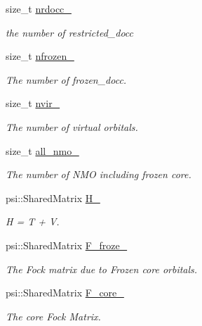 \begin{DoxyCompactItemize}
size\+\_\+t \mbox{\hyperlink{classforte_1_1_orbital_optimizer_a086d17877eb4c87547c6caaf7660ec27}{nrdocc\+\_\+}}
\begin{DoxyCompactList}\small\item\em the number of restricted\+\_\+docc \end{DoxyCompactList}\item 
size\+\_\+t \mbox{\hyperlink{classforte_1_1_orbital_optimizer_a8d53170a8913f34344f9068d65a948f9}{nfrozen\+\_\+}}
\begin{DoxyCompactList}\small\item\em The number of frozen\+\_\+docc. \end{DoxyCompactList}\item 
size\+\_\+t \mbox{\hyperlink{classforte_1_1_orbital_optimizer_a18aeed651c18e3774ceded5f83b424ec}{nvir\+\_\+}}
\begin{DoxyCompactList}\small\item\em The number of virtual orbitals. \end{DoxyCompactList}\item 
size\+\_\+t \mbox{\hyperlink{classforte_1_1_orbital_optimizer_a3049d4ffa9016122c75062f30273585d}{all\+\_\+nmo\+\_\+}}
\begin{DoxyCompactList}\small\item\em The number of N\+MO including frozen core. \end{DoxyCompactList}\item 
psi\+::\+Shared\+Matrix \mbox{\hyperlink{classforte_1_1_orbital_optimizer_ad82c00e627723c1fe086d03783e8cd28}{H\+\_\+}}
\begin{DoxyCompactList}\small\item\em H = T + V. \end{DoxyCompactList}\item 
psi\+::\+Shared\+Matrix \mbox{\hyperlink{classforte_1_1_orbital_optimizer_a82e9925ea8bd99323035022a23e2268d}{F\+\_\+froze\+\_\+}}
\begin{DoxyCompactList}\small\item\em The Fock matrix due to Frozen core orbitals. \end{DoxyCompactList}\item 
psi\+::\+Shared\+Matrix \mbox{\hyperlink{classforte_1_1_orbital_optimizer_aa04f54da75fd34ecf6feddc891d27bcf}{F\+\_\+core\+\_\+}}
\begin{DoxyCompactList}\small\item\em The core Fock Matrix. \end{DoxyCompactList}\item 

\end{DoxyCompactItemize}
